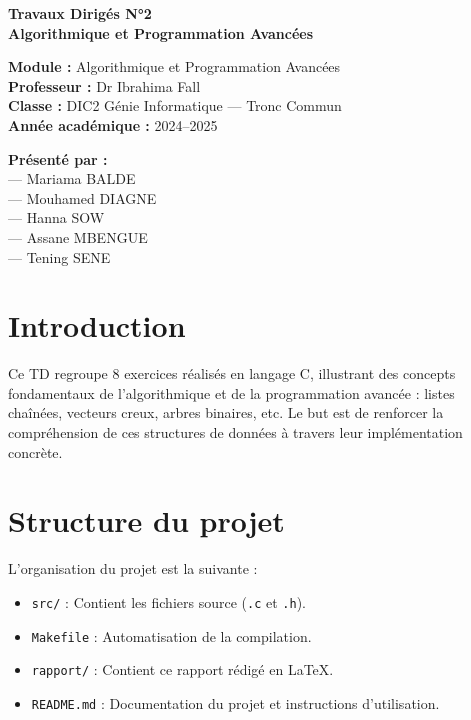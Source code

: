 \documentclass[a4paper,12pt]{article}
\begin{document}
\begin{titlepage}
    \centering
    \vspace*{2cm}
    
    {\Large\bfseries Travaux Dirigés N°2 \\[0.5cm]}
    {\LARGE\bfseries Algorithmique et Programmation Avancées\\[1cm]}
    
    \vfill
    
    \begin{flushleft}
    \textbf{Module :} Algorithmique et Programmation Avancées\\[0.3cm]
        \textbf{Professeur :} Dr Ibrahima Fall\\[0.3cm]
        \textbf{Classe :} DIC2 Génie Informatique — Tronc Commun\\[0.3cm]
        \textbf{Année académique :} 2024–2025
    \end{flushleft}
    
    \vfill
    
    \begin{flushright}
        \textbf{Présenté par :}\\
        — Mariama BALDE\\
        — Mouhamed DIAGNE\\
        — Hanna SOW\\
        — Assane MBENGUE\\
        — Tening SENE
    \end{flushright}
    
    \vfill

    \vspace*{1cm}
\end{titlepage}





\tableofcontents
\newpage

\section{Introduction}
Ce TD regroupe 8 exercices réalisés en langage C, illustrant des concepts fondamentaux de l'algorithmique et de la programmation avancée : listes chaînées, vecteurs creux, arbres binaires, etc.  
Le but est de renforcer la compréhension de ces structures de données à travers leur implémentation concrète.

\section{Structure du projet}
L'organisation du projet est la suivante :
\begin{itemize}
    \item \texttt{src/} : Contient les fichiers source (\texttt{.c} et \texttt{.h}).
    \item \texttt{Makefile} : Automatisation de la compilation.
    \item \texttt{rapport/} : Contient ce rapport rédigé en \LaTeX.
    \item \texttt{README.md} : Documentation du projet et instructions d’utilisation.
\end{itemize}
\end{document}
